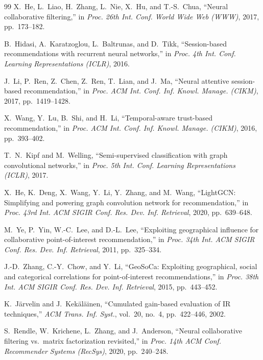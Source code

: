\documentclass[conference]{IEEEtran}
\begin{document}
\begin{thebibliography}{99}
X.~He, L.~Liao, H.~Zhang, L.~Nie, X.~Hu, and T.-S.~Chua,
``Neural collaborative filtering,''
in \emph{Proc. 26th Int. Conf. World Wide Web (WWW)}, 2017,
pp.~173--182.

B.~Hidasi, A.~Karatzoglou, L.~Baltrunas, and D.~Tikk,
``Session-based recommendations with recurrent neural networks,''
in \emph{Proc. 4th Int. Conf. Learning Representations (ICLR)}, 2016.

J.~Li, P.~Ren, Z.~Chen, Z.~Ren, T.~Lian, and J.~Ma,
``Neural attentive session-based recommendation,''
in \emph{Proc. ACM Int. Conf. Inf. Knowl. Manage. (CIKM)}, 2017,
pp.~1419--1428.

X.~Wang, Y.~Lu, B.~Shi, and H.~Li,
``Temporal-aware trust-based recommendation,''
in \emph{Proc. ACM Int. Conf. Inf. Knowl. Manage. (CIKM)}, 2016,
pp.~393--402.

T.~N.~Kipf and M.~Welling,
``Semi-supervised classification with graph convolutional networks,''
in \emph{Proc. 5th Int. Conf. Learning Representations (ICLR)}, 2017.

X.~He, K.~Deng, X.~Wang, Y.~Li, Y.~Zhang, and M.~Wang,
``LightGCN: Simplifying and powering graph convolution network for
recommendation,''
in \emph{Proc. 43rd Int. ACM SIGIR Conf. Res. Dev. Inf. Retrieval},
2020, pp.~639--648.

M.~Ye, P.~Yin, W.-C.~Lee, and D.-L.~Lee,
``Exploiting geographical influence for collaborative point-of-interest
recommendation,''
in \emph{Proc. 34th Int. ACM SIGIR Conf. Res. Dev. Inf. Retrieval},
2011, pp.~325--334.

J.-D.~Zhang, C.-Y.~Chow, and Y.~Li,
``GeoSoCa: Exploiting geographical, social and categorical correlations
for point-of-interest recommendations,''
in \emph{Proc. 38th Int. ACM SIGIR Conf. Res. Dev. Inf. Retrieval},
2015, pp.~443--452.

K.~J\"{a}rvelin and J.~Kek\"{a}l\"{a}inen,
``Cumulated gain-based evaluation of IR techniques,''
\emph{ACM Trans. Inf. Syst.}, vol.~20, no.~4, pp.~422--446, 2002.

S.~Rendle, W.~Krichene, L.~Zhang, and J.~Anderson,
``Neural collaborative filtering vs.\ matrix factorization revisited,''
in \emph{Proc. 14th ACM Conf. Recommender Systems (RecSys)}, 2020,
pp.~240--248.

\end{thebibliography}
\end{document}
